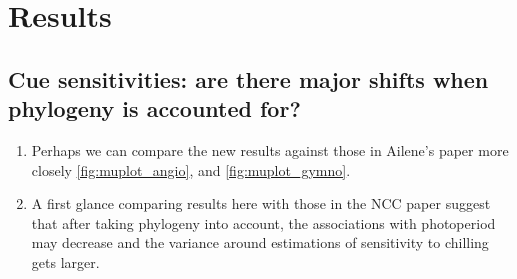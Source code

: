 \documentclass{article}\usepackage[]{graphicx}\usepackage[]{color}
\begin{document}

\section*{Results}


\subsection*{Cue sensitivities: are there major shifts when phylogeny is accounted for?}

\begin{enumerate}

\item Perhaps we can compare the new results against those in Ailene's paper more closely \ref{fig:muplot_angio}, and \ref{fig:muplot_gymno}.

\item A first glance comparing results here with those in the NCC paper suggest that after taking phylogeny into account, the associations with photoperiod may decrease and the variance around estimations of sensitivity to chilling gets larger.
\end{enumerate}
\end{document}
